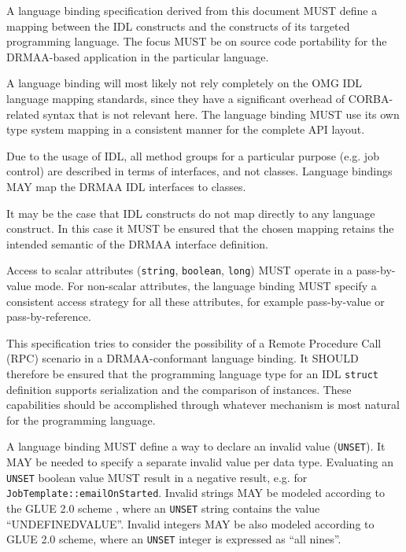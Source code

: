 \documentclass{article}
\newcommand{\h}[1]{\lstinline|#1|}
\newcommand{\langbind}[1]{\begin{shaded}#1\end{shaded}}
\newcommand{\rat}[1]{}
\begin{document}
\langbind{
A language binding specification derived from this document MUST define a mapping between the IDL constructs and the constructs of its targeted programming language. The focus MUST be on source code portability for the DRMAA-based application in the particular language.

A language binding will most likely not rely completely on the OMG IDL language mapping standards, since they have a significant overhead of CORBA-related syntax that is not relevant here. The language binding MUST use its own type system mapping in a consistent manner for the complete API layout.

Due to the usage of IDL, all method groups for a particular purpose (e.g. job control) are described in terms of interfaces, and not classes. Language bindings MAY map the DRMAA IDL interfaces to classes.

It may be the case that IDL constructs do not map directly to any language construct. In this case it MUST be ensured that the chosen mapping retains the intended semantic of the DRMAA interface definition.

Access to scalar attributes (\h{string}, \h{boolean}, \h{long}) MUST operate in a pass-by-value mode. For non-scalar attributes, the language binding MUST specify a consistent access strategy for all these attributes, for example pass-by-value or pass-by-reference.

This specification tries to consider the possibility of a Remote Procedure Call (RPC) scenario in a DRMAA-conformant language binding. It SHOULD therefore be ensured that the programming language type for an IDL \h{struct} definition supports serialization and the comparison of instances. These capabilities should be accomplished through whatever mechanism is most natural for the programming language.

A language binding MUST define a way to declare an invalid value (\h{UNSET}). It MAY be needed to specify a separate invalid value per data type. Evaluating an \h{UNSET} boolean value MUST result in a negative result, e.g. for \h{JobTemplate::emailOnStarted}. Invalid strings MAY be modeled according to the GLUE 2.0 scheme \cite{gfd.147}, where an \h{UNSET} string contains the value \enquote{UNDEFINEDVALUE}.  Invalid integers MAY be also modeled according to GLUE 2.0 scheme, where an \h{UNSET} integer is expressed as \enquote{all nines}.
}

\rat{
The concept of a UNSET value was decided on a conf call (Aug 25th 2010). Boolean in C can use custom enumeration (TRUE, FALSE, INVALID) or pointer to static values. A numerical UNSET in C should use a magic number, since all long attributes are unsigned, it could be MIN\_INT. With Python, just use \h{None}. For Java, Dan has an idea.
}
\end{document}
